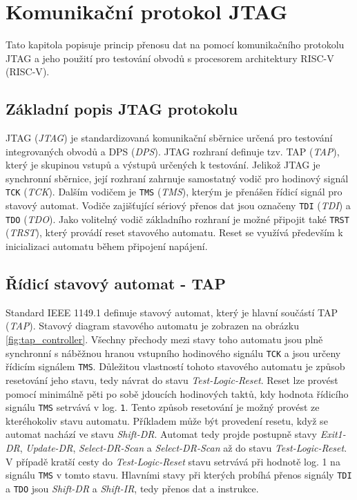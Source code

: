 \chapter{Komunikační protokol JTAG}
Tato kapitola popisuje princip přenosu dat na pomocí komunikačního protokolu JTAG a jeho použití pro testování obvodů s procesorem architektury \acs{RISC-V} (\acl{RISC-V}).

\section{Základní popis \acs{JTAG} protokolu}
\acs{JTAG} (\textit{\acl{JTAG}}) je standardizovaná komunikační sběrnice určená pro testování integrovaných obvodů a \acs{DPS} (\textit{\acl{DPS}}).
\acs{JTAG} rozhraní definuje tzv. \acs{TAP} (\textit{\acl{TAP}}), který je skupinou vstupů a výstupů určených k testování. Jelikož \acs{JTAG} je synchronní sběrnice, její rozhraní zahrnuje samostatný vodič pro hodinový signál \texttt{\acs{TCK}} (\textit{\acl{TCK}}). Dalším vodičem je \texttt{\acs{TMS}} (\textit{\acl{TMS}}), kterým je přenášen řídicí signál pro stavový automat. Vodiče zajišťující sériový přenos dat jsou označeny \texttt{\acs{TDI}} (\textit{\acl{TDI}}) a \texttt{\acs{TDO}} (\textit{\acl{TDO}}). Jako volitelný vodič základního rozhraní je možné připojit také \texttt{\acs{TRST}} (\textit{\acl{TRST}}), který provádí reset stavového automatu. Reset se využívá především k inicializaci automatu během připojení napájení. \cite {IEEE_1149-1} \cite{JTAG}      


\section{Řídicí stavový automat - \acs{TAP}}
Standard IEEE 1149.1 definuje stavový automat, který je hlavní součástí \acs{TAP} (\textit{\acl{TAP}}). Stavový diagram stavového automatu je zobrazen na obrázku \ref{fig:tap_controller}. Všechny přechody mezi stavy toho automatu jsou plně synchronní s náběžnou hranou vstupního hodinového signálu \texttt{\acs{TCK}} a jsou určeny řídicím signálem \texttt{\acs{TMS}}. Důležitou vlastností tohoto stavového automatu je způsob resetování jeho stavu, tedy návrat do stavu \textit{Test-Logic-Reset}. Reset lze provést pomocí minimálně pěti po sobě jdoucích hodinových taktů, kdy hodnota řídicího signálu \texttt{\acs{TMS}} setrvává v log. \texttt{1}. Tento způsob resetování je možný provést ze kteréhokoliv stavu automatu. Příkladem může být provedení resetu, když se automat nachází ve stavu \textit{Shift-DR}. Automat tedy projde postupně stavy \textit{Exit1-DR}, \textit{Update-DR}, \textit{Select-DR-Scan} a \textit{Select-DR-Scan} až do stavu \textit{Test-Logic-Reset}. V případě kratší cesty do \textit{Test-Logic-Reset} stavu setrvává při hodnotě log. 1 na signálu \texttt{\acs{TMS}} v tomto stavu. Hlavními stavy při kterých probíhá přenos signály \texttt{\acs{TDI}} a \texttt{\acs{TDO}} jsou \textit{Shift-DR} a \textit{Shift-IR}, tedy přenos dat a instrukce. \cite {IEEE_1149-1}

